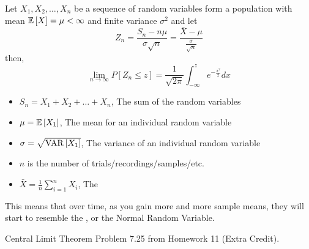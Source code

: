 		\begin{theorem} \label{thm:Central Limit Theorem}
			Let $X_{1},X_{2},\ldots,X_{n}$ be a sequence of  random variables form a population with mean $\operatorname{\operatorname{\mathbb{E}}} \left[ X \right] = \mu < \infty$ and finite variance $\sigma^{2}$ and let
			\begin{equation*}
				Z_{n} = \frac{S_{n} - n\mu}{\sigma \sqrt{n}} = \frac{\bar{X} - \mu}{\frac{\sigma}{\sqrt{n}}}
			\end{equation*}
			then,
			\begin{equation} \label{eq:Central Limit Theorem}
				\lim\limits_{n \rightarrow \infty} P \left[ Z_{n} \leq z \right] = \frac{1}{\sqrt{2 \pi}} \int_{-\infty}^{z} e^{-\frac{x^{2}}{2}} dx
			\end{equation}
			\begin{itemize} %
				\item $S_{n}=X_{1}+X_{2}+\ldots+X_{n}$, The sum of the random variables
				\item $\mu=\operatorname{\operatorname{\mathbb{E}}} \left[ X_{1} \right]$, The mean for an individual random variable
				\item $\sigma=\sqrt{\operatorname{\operatorname{VAR}} \left[ X_{1} \right]}$, The variance of an individual random variable
				\item $n$ is the number of trials/recordings/samples/etc.
				\item $\bar{X} = \frac{1}{n} \sum\limits_{i=1}^{n} X_{i}$, The 
			\end{itemize}
			\begin{remark*}
				This means that over time, as you gain more and more sample means, they will start to resemble the , or the Normal Random Variable.
			\end{remark*}
		\end{theorem}
		\begin{example}[Problem 7.25]{Central Limit Theorem} 
			Problem 7.25 from Homework 11 (Extra Credit).
		\end{example}
	
